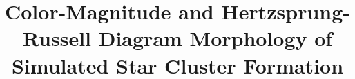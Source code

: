 \documentclass[linenumbers, twocolumn]{aastex631}
\begin{document}
\title{Color-Magnitude and Hertzsprung-Russell Diagram Morphology of Simulated Star Cluster Formation}


\end{document}
